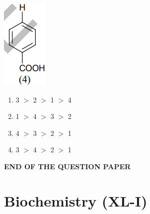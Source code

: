 \documentclass[journal,12pt,onecolumn]{IEEEtran}
\theoremstyle{remark}
\begin{document}
\begin{enumerate}
\begin{enumerate}
\begin{multicols}{2}
      \item \includegraphics[width=0.3\columnwidth]{fig23.png} 
\end{multicols}
  \end{enumerate}
  \begin{multicols}{2}
  \begin{enumerate}
    \item 3 $>$ 2 $>$ 1 $>$ 4
    \item 1 $>$ 4 $>$ 3 $>$ 2
    \item 4 $>$ 3 $>$ 2 $>$ 1
    \item 3 $>$ 4 $>$ 2 $>$ 1
  \end{enumerate}
  \end{multicols}
\end{enumerate}
\begin{center}
    \textbf{END OF THE QUESTION PAPER}
\end{center}

\newpage
\section*{\textbf{Biochemistry (XL-I)}}
\end{document}
